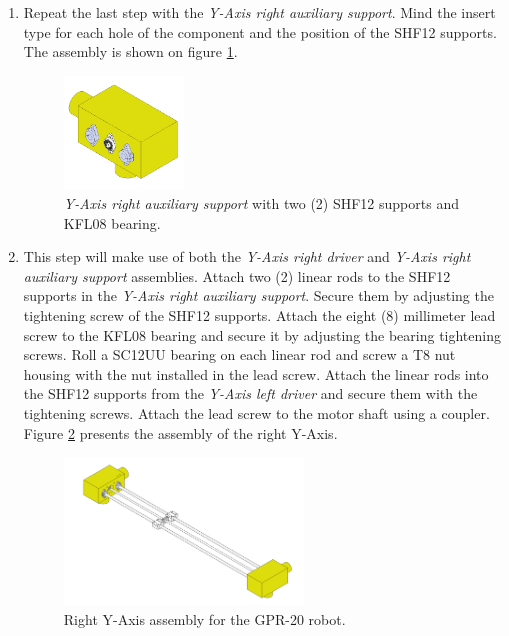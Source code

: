 \documentclass{article}
\begin{document}
\begin{enumerate}
    \item Repeat the last step with the \textit{Y-Axis right auxiliary support}. Mind the insert type for each hole of the component and the position of the SHF12 supports. The assembly is shown on figure \ref{fig:ya_step_8}.
    
    \begin{figure}[H]
        \centering
        \includegraphics[width=0.3\textwidth]{images/y_axis/step_H.png}
        \caption{\textit{Y-Axis right auxiliary support} with two (2) SHF12 supports and KFL08 bearing.}
        \label{fig:ya_step_8}
    \end{figure}
    
    \item This step will make use of both the \textit{Y-Axis right driver} and \textit{Y-Axis right auxiliary support} assemblies. Attach two (2) linear rods to the SHF12 supports in the \textit{Y-Axis right auxiliary support}. Secure them by adjusting the tightening screw of the SHF12 supports. Attach the eight (8) millimeter lead screw to the KFL08 bearing and secure it by adjusting the bearing tightening screws. Roll a SC12UU bearing on each linear rod and screw a T8 nut housing with the nut installed in the lead screw. Attach the linear rods into the SHF12 supports from the \textit{Y-Axis left driver} and secure them with the tightening screws. Attach the lead screw to the motor shaft using a coupler. Figure \ref{fig:ya_step_9} presents the assembly of the right Y-Axis.
    
    \begin{figure}[H]
        \centering
        \includegraphics[width=0.6\textwidth]{images/y_axis/step_I.png}
        \caption{Right Y-Axis assembly for the GPR-20 robot.}
        \label{fig:ya_step_9}
    \end{figure}
    

\end{enumerate}
\end{document}
